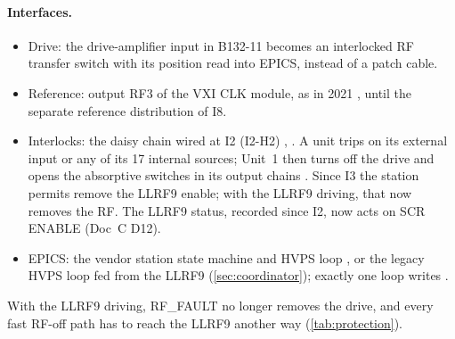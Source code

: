 \paragraph{Interfaces.}
\begin{itemize}
\item Drive: the drive-amplifier input in B132-11 becomes an interlocked RF transfer
switch with its position read into EPICS, instead of a patch cable.
\item Reference: output RF3 of the VXI CLK module, as in 2021 , until the
separate reference distribution of I8.
\item Interlocks: the daisy chain wired at I2 (I2-H2) , . A unit trips on its
external input or any of its 17 internal sources; Unit~1 then turns off the drive and
opens the absorptive switches in its output chains . Since I3 the station
permits remove the LLRF9 enable; with the LLRF9 driving, that now removes the RF. The
LLRF9 status, recorded since I2, now acts on SCR ENABLE (Doc~C D12).
\item EPICS: the vendor station state machine and HVPS loop , or the legacy
HVPS loop fed from the LLRF9 (\cref{sec:coordinator}); exactly one loop writes
.
\end{itemize}

With the LLRF9 driving, RF\_FAULT no longer removes the drive, and every fast RF-off
path has to reach the LLRF9 another way (\cref{tab:protection}).

